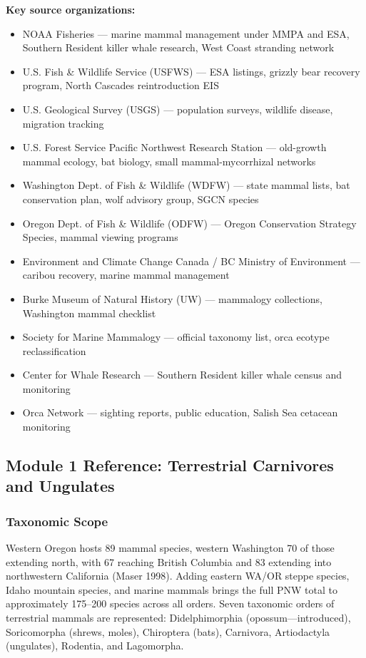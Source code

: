 \documentclass[11pt,letterpaper]{article}
\begin{document}
\textbf{Key source organizations:}
\begin{itemize}[leftmargin=2em]
\item NOAA Fisheries --- marine mammal management under MMPA and ESA, Southern Resident killer whale research, West Coast stranding network
\item U.S. Fish \& Wildlife Service (USFWS) --- ESA listings, grizzly bear recovery program, North Cascades reintroduction EIS
\item U.S. Geological Survey (USGS) --- population surveys, wildlife disease, migration tracking
\item U.S. Forest Service Pacific Northwest Research Station --- old-growth mammal ecology, bat biology, small mammal-mycorrhizal networks
\item Washington Dept. of Fish \& Wildlife (WDFW) --- state mammal lists, bat conservation plan, wolf advisory group, SGCN species
\item Oregon Dept. of Fish \& Wildlife (ODFW) --- Oregon Conservation Strategy Species, mammal viewing programs
\item Environment and Climate Change Canada / BC Ministry of Environment --- caribou recovery, marine mammal management
\item Burke Museum of Natural History (UW) --- mammalogy collections, Washington mammal checklist
\item Society for Marine Mammalogy --- official taxonomy list, orca ecotype reclassification
\item Center for Whale Research --- Southern Resident killer whale census and monitoring
\item Orca Network --- sighting reports, public education, Salish Sea cetacean monitoring
\end{itemize}

\subsection{Module 1 Reference: Terrestrial Carnivores and Ungulates}

\subsubsection{Taxonomic Scope}
Western Oregon hosts 89 mammal species, western Washington 70 of those extending north, with 67 reaching British Columbia and 83 extending into northwestern California (Maser 1998). Adding eastern WA/OR steppe species, Idaho mountain species, and marine mammals brings the full PNW total to approximately 175--200 species across all orders. Seven taxonomic orders of terrestrial mammals are represented: Didelphimorphia (opossum---introduced), Soricomorpha (shrews, moles), Chiroptera (bats), Carnivora, Artiodactyla (ungulates), Rodentia, and Lagomorpha.
\end{document}
